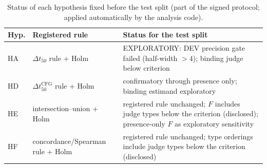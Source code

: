 \begin{table}[t]\centering\small
\caption{Status of each hypothesis fixed before the test split (part of the signed protocol; applied automatically by the analysis code).}\label{tab:status}
\begin{tabular}{lp{4.2cm}p{6.0cm}}
\toprule
Hyp. & Registered rule & Status for the test split \\
\midrule
HA & $\Delta t_{50}$ rule + Holm & EXPLORATORY: DEV precision gate failed (half-width \haHalfwidth{} $>4$); binding judge below criterion \\
HD & $\Delta t_{50}^{\mathrm{CFG}}$ rule + Holm & confirmatory through presence only; binding estimand exploratory \\
HE & intersection--union + Holm & registered rule unchanged; $F$ includes judge types below the criterion (disclosed); presence-only $F$ as exploratory sensitivity \\
HF & concordance/Spearman rule + Holm & registered rule unchanged; type orderings include judge types below the criterion (disclosed) \\
\bottomrule
\end{tabular}
\end{table}
